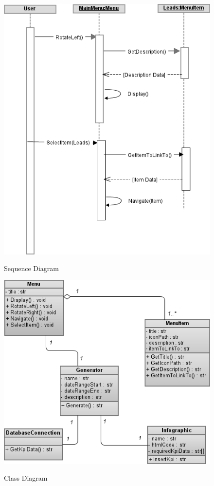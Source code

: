 \documentclass[11pt,a4paper,oneside]{article}
\begin{document}
\begin{figure}[!]
\caption{Sequence Diagram}
\includegraphics[width=1\textwidth]{images/Capstone_-_Sequence_Diagram.png}\\
\end{figure}


\begin{figure}[!]
\caption{Class Diagram}
\includegraphics[width=1\textwidth]{images/Capstone_-_Class_Diagram.png}\\
\end{figure}
\end{document}
